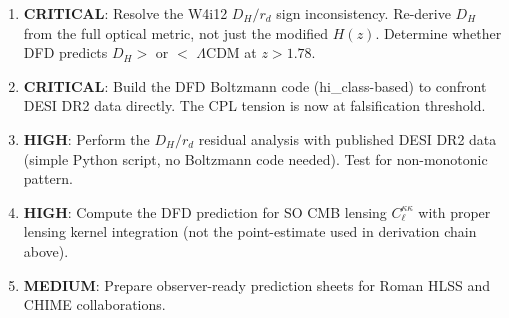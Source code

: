 \documentclass[11pt,a4paper]{article}
\newcommand{\LCDM}{$\Lambda$CDM}
\begin{document}
\begin{enumerate}
\item \textbf{CRITICAL}: Resolve the W4i12 $D_H/r_d$ sign inconsistency.
  Re-derive $D_H$ from the full optical metric, not just the modified
  $H(z)$. Determine whether DFD predicts $D_H >$ or $<$ \LCDM{} at
  $z > 1.78$.

\item \textbf{CRITICAL}: Build the DFD Boltzmann code (hi\_class-based)
  to confront DESI DR2 data directly. The CPL tension is now at
  falsification threshold.

\item \textbf{HIGH}: Perform the $D_H/r_d$ residual analysis with
  published DESI DR2 data (simple Python script, no Boltzmann code
  needed). Test for non-monotonic pattern.

\item \textbf{HIGH}: Compute the DFD prediction for SO CMB lensing
  $C_\ell^{\kappa\kappa}$ with proper lensing kernel integration
  (not the point-estimate used in derivation chain above).

\item \textbf{MEDIUM}: Prepare observer-ready prediction sheets for
  Roman HLSS and CHIME collaborations.
\end{enumerate}
\end{document}
